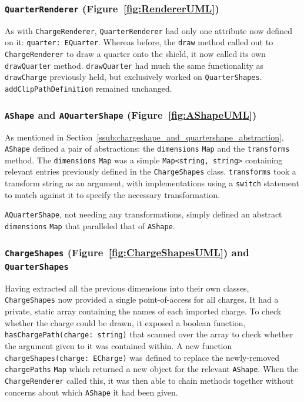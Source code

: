 \documentclass[nobib, a4paper, twoside, justified]{tufte-book}
\makeatletter
\newcommand{\charge}{\gls{charge}\@\xspace}
\newcommand{\charges}{\glspl{charge}\@\xspace}
\makeatother
\begin{document}
\subsubsection{\texttt{QuarterRenderer} (Figure~\ref{fig:RendererUML})}%
\label{ssub:quarterrenderer}

As with \texttt{ChargeRenderer}, \texttt{QuarterRenderer} had only one attribute now defined on it:
\texttt{quarter: EQuarter}. Whereas before, the \texttt{draw} method called out to
\texttt{ChargeRenderer} to draw a quarter onto the shield, it now called its own
\texttt{drawQuarter} method. \texttt{drawQuarter} had much the same functionality as
\texttt{drawCharge} previously held, but exclusively worked on \texttt{QuarterShapes}.
\texttt{addClipPathDefinition} remained unchanged.

\subsubsection{\texttt{AShape} and \texttt{AQuarterShape} (Figure~\ref{fig:AShapeUML})}%
\label{ssub:ashape_and_aquartershape}

As mentioned in Section~\ref{ssub:chargeshape_and_quartershape_abstraction}, \texttt{AShape}
defined a pair of abstractions: the \texttt{dimensions} \texttt{Map} and the \texttt{transforms}
method. The \texttt{dimensions} \texttt{Map} was a simple \texttt{Map<string, string>} containing
relevant entries previously defined in the \texttt{ChargeShapes} class. \texttt{transforms} took a
transform string as an argument, with implementations using a \texttt{switch} statement to match
against it to specify the necessary transformation.

\texttt{AQuarterShape}, not needing any transformations, simply defined an abstract
\texttt{dimensions} \texttt{Map} that paralleled that of \texttt{AShape}.

\subsubsection{\texttt{ChargeShapes} (Figure~\ref{fig:ChargeShapesUML}) and \texttt{QuarterShapes}}%
\label{ssub:chargeshapes_and_quartershapes}

Having extracted all the previous dimensions into their own classes, \texttt{ChargeShapes} now
provided a single point-of-access for all \charges. It had a private, static array containing the
names of each imported \charge. To check whether the \charge could be drawn, it exposed a boolean
function, \texttt{hasChargePath(charge: string)} that scanned over the array to check whether the
argument given to it was contained within. A new function \texttt{chargeShapes(charge: ECharge)}
was defined to replace the newly-removed \texttt{chargePaths} \texttt{Map} which returned a new
object for the relevant \texttt{AShape}. When the \texttt{ChargeRenderer} called this, it was then able to
chain methods together without concerns about which \texttt{AShape} it had been given.
\end{document}
